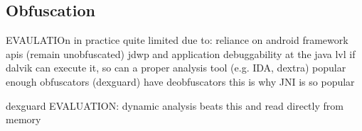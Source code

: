 \subsection{Obfuscation}
\label{subsection:evaluation-reengineering-optobf}

EVAULATIOn
in practice quite limited due to:
reliance on android framework apis (remain unobfuscated)
jdwp and application debuggability at the java lvl
if dalvik can execute it, so can a proper analysis tool (e.g. IDA, dextra)
popular enough obfuscators (dexguard) have deobfuscators
this is why JNI is so popular

dexguard EVALUATION:  dynamic analysis beats this and read directly from memory
